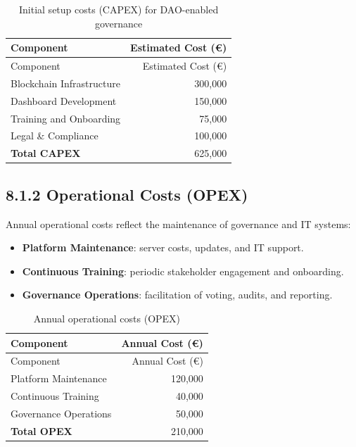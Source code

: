 \documentclass[
  english,
  12pt,
  oneside,
  open=any]{scrbook}
\providecommand{\tightlist}{%
  \setlength{\itemsep}{0pt}\setlength{\parskip}{0pt}}\usepackage{longtable,booktabs,array}
\begin{document}
\begin{longtable}[]{@{}lr@{}}
\caption{Initial setup costs (CAPEX) for DAO-enabled
governance}\label{tbl-capex}\tabularnewline
\toprule\noalign{}
Component & Estimated Cost (€) \\
\midrule\noalign{}
\endfirsthead
\toprule\noalign{}
Component & Estimated Cost (€) \\
\midrule\noalign{}
\endhead
\bottomrule\noalign{}
\endlastfoot
Blockchain Infrastructure & 300,000 \\
Dashboard Development & 150,000 \\
Training and Onboarding & 75,000 \\
Legal \& Compliance & 100,000 \\
\textbf{Total CAPEX} & 625,000 \\
\end{longtable}

\subsection{8.1.2 Operational Costs (OPEX)}\label{sec-opex}

Annual operational costs reflect the maintenance of governance and IT
systems:

\begin{itemize}
\tightlist
\item
  \textbf{Platform Maintenance}: server costs, updates, and IT
  support.\\
\item
  \textbf{Continuous Training}: periodic stakeholder engagement and
  onboarding.\\
\item
  \textbf{Governance Operations}: facilitation of voting, audits, and
  reporting.
\end{itemize}

\begin{longtable}[]{@{}lr@{}}
\caption{Annual operational costs (OPEX)}\label{tbl-opex}\tabularnewline
\toprule\noalign{}
Component & Annual Cost (€) \\
\midrule\noalign{}
\endfirsthead
\toprule\noalign{}
Component & Annual Cost (€) \\
\midrule\noalign{}
\endhead
\bottomrule\noalign{}
\endlastfoot
Platform Maintenance & 120,000 \\
Continuous Training & 40,000 \\
Governance Operations & 50,000 \\
\textbf{Total OPEX} & 210,000 \\
\end{longtable}
\end{document}
